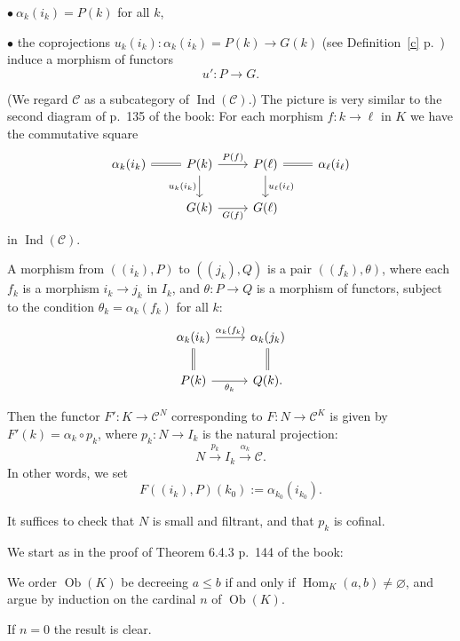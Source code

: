 \documentclass[12pt]{article}
\theoremstyle{remark}
\theoremstyle{definition}
\newcommand{\bu}{\bullet}
\newcommand{\C}{\mathcal C}
\newcommand{\xr}{\xrightarrow}
\DeclareMathOperator{\Hom}{Hom}%
\DeclareMathOperator{\Ind}{Ind}
\DeclareMathOperator{\Ob}{Ob}
\begin{document}
\noindent$\bu\ \alpha_k(i_k)=P(k)$ for all $k$, 

\noindent$\bu$ the coprojections $u_k(i_k):\alpha_k(i_k)=P(k)\to G(k)$ (see Definition~\ref{c} p.~\pageref{c}) induce a morphism of functors 
%
\begin{equation}\label{u'}
u':P\to G.
\end{equation}

\noindent(We regard $\C$ as a subcategory of $\Ind(\C)$.) The picture is very similar to the second diagram of p.~135 of the book: For each morphism $f:k\to\ell$ in $K$ we have the commutative square 
$$ 
\begin{tikzcd} 
\alpha_k(i_k)\ar[equal]{r}&P(k)\ar{r}{P(f)}\ar{d}[swap]{u_k(i_k)}&P(\ell)\ar{d}{u_\ell(i_\ell)}\ar[equal]{r}&\alpha_\ell(i_\ell)\\ 
{}&G(k)\ar{r}[swap]{G(f)}&G(\ell) 
\end{tikzcd} 
$$ 
in $\Ind(\C)$. 

A morphism from $((i_k),P)$ to $((j_k),Q)$ is a pair $((f_k),\theta)$, where each $f_k$ is a morphism $i_k\to j_k$ in $I_k$, and $\theta:P\to Q$ is a morphism of functors, subject to the condition $\theta_k=\alpha_k(f_k)$ for all $k$: 
$$ 
\begin{tikzcd} 
\alpha_k(i_k)\ar{r}{\alpha_k(f_k)}\ar[equal]{d}&\alpha_k(j_k)\ar[equal]{d}\\ 
P(k)\ar{r}[swap]{\theta_k}&Q(k).
\end{tikzcd} 
$$ 

Then the functor $F':K\to\C^N$ corresponding to $F:N\to\C^K$ is given by $F'(k)=\alpha_k\circ p_k$, where $p_k:N\to I_k$ is the natural projection: 
$$
N\xr{p_k}I_k\xr{\alpha_k}\C.
$$ 
In other words, we set
$$
F((i_k),P)(k_0):=\alpha_{k_0}(i_{k_0}).
$$ 

It suffices to check that $N$ is small and filtrant, and that $p_k$ is cofinal. 

We start as in the proof of Theorem 6.4.3 p.~144 of the book: 

We order $\Ob(K)$ be decreeing $a\le b$ if and only if $\Hom_K(a,b)\neq\varnothing$, and argue by induction on the cardinal $n$ of $\Ob(K)$. 

If $n=0$ the result is clear.
\end{document}

